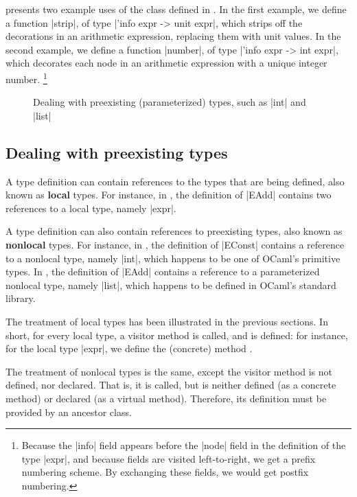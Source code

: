 \documentclass[11pt,a4paper,twoside]{article}
\renewcommand{\emph}[1]{\textbf{#1}}
\begin{document}
 presents two example uses of the class \map defined in
. In the first example, we define a function \oc|strip|, of
type \oc|'info expr -> unit expr|, which strips off the decorations in an
arithmetic expression, replacing them with unit values. In the second example,
we define a function \oc|number|, of type \oc|'info expr -> int expr|, which
decorates each node in an arithmetic expression with a unique integer number.%
\footnote{Because the \oc|info| field appears before the \oc|node| field in
  the definition of the type \oc|expr|, and because fields are visited
  left-to-right, we get a prefix numbering scheme. By exchanging these fields,
  we would get postfix numbering.} %


\begin{figure}[t]
\vspace{-\baselineskip}
\caption{Dealing with preexisting (parameterized) types, such as \oc|int| and \oc|list|}
\label{fig:expr11}
\end{figure}

\subsection{Dealing with preexisting types}
\label{sec:intro:nonlocal}

A type definition can contain references to the types that are being defined,
also known as \emph{local} types. For instance, in , the
definition of \oc|EAdd| contains two references to a local type, namely
\oc|expr|.

A type definition can also contain references to preexisting types, also
known as \emph{nonlocal} types. For instance, in , the
definition of \oc|EConst| contains a reference to a nonlocal type, namely
\oc|int|, which happens to be one of OCaml's primitive types. In
, the definition of \oc|EAdd| contains a reference to a
parameterized nonlocal type, namely \oc|list|, which happens to be defined in
OCaml's standard library.

The treatment of local types has been illustrated in the previous sections. In
short, for every local type, a visitor method is called, and is defined:
for instance, for the local type \oc|expr|, we define the (concrete) method
.

The treatment of nonlocal types is the same, except the visitor method is not
defined, nor declared. That is, it is called, but is neither defined (as a
concrete method) or declared (as a virtual method). Therefore, its definition
must be provided by an ancestor class.
\end{document}
